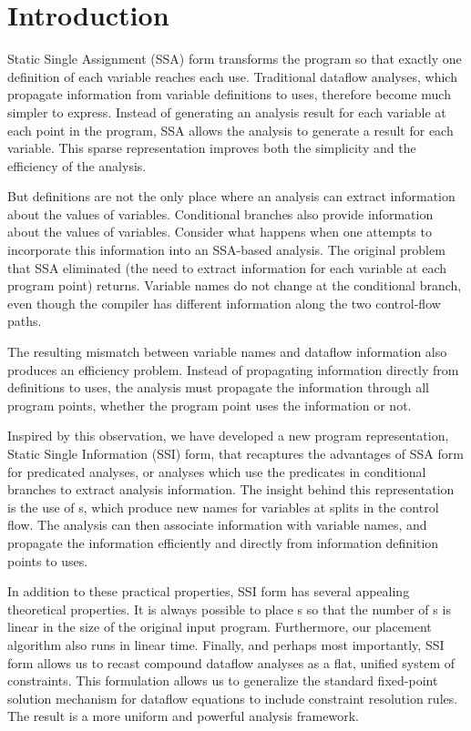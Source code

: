 \section{Introduction}

Static Single Assignment (SSA) form transforms the
program so that exactly one definition of each 
variable reaches each use. Traditional dataflow
analyses, which propagate information from variable
definitions to uses, therefore become much simpler
to express. Instead of generating an analysis 
result for each variable at each point in the
program, SSA allows the analysis to generate a 
result for each variable. This sparse
representation improves both the simplicity
and the efficiency of the analysis. 

But definitions are not the only place where
an analysis can extract information about the
values of variables. Conditional branches also
provide information about the values of variables.
Consider what happens when one attempts to incorporate
this information into an SSA-based analysis. The
original problem that SSA eliminated (the need to
extract information for each variable at each
program point) returns. Variable names do not
change at the conditional branch, even though
the compiler has different information along the
two control-flow paths.

The resulting mismatch between variable names
and dataflow information also produces an efficiency
problem. Instead of propagating information
directly from definitions to uses, the analysis
must propagate the information through all 
program points, whether the program point uses 
the information or not. 

Inspired by this observation, we have developed
a new program representation, 
Static Single Information (SSI) form,  that recaptures
the advantages of SSA form for predicated analyses,
or analyses which use the predicates in conditional
branches to extract analysis information.
The insight behind this representation is the use
of \sigfunction{}s, which produce new names
for variables at splits in the control flow.
The analysis can then associate information
with variable names, and propagate
the information efficiently and directly from 
information definition points to uses. 

In addition to these practical properties, 
SSI form has several appealing 
theoretical properties. It is always possible 
to place \sigfunction{}s so that the
number of \sigfunction{}s is linear in the size
of the original input program. Furthermore, our
placement algorithm also runs in linear time. 
Finally, and perhaps most importantly, SSI form
allows us to recast compound dataflow analyses as
a flat, unified system of constraints. This
formulation allows us to generalize the standard
fixed-point solution
mechanism for dataflow equations to include 
constraint resolution rules. The result is 
a more uniform and powerful analysis framework.

